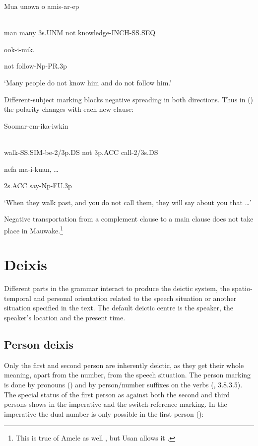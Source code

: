 \ea%
\label{ex:x1139}
\gll Mua  unowa  o    amis-ar-ep \\
      \\
\glt
\z

man  many  3s.UNM  not  knowledge-INCH-SS.SEQ

  ook-i-mik.

not  follow-Np-PR.3p

`Many people do not know him and do not follow him.'

Different-subject marking blocks negative spreading in both directions. Thus in () the polarity changes with each new clause:

\ea%
\label{ex:x1141}
\gll Soomar-em-ika-iwkin   \\
      \\
\glt
\z

walk-SS.SIM-be-2/3p.DS  not  3p.ACC  call-2/3s.DS

nefa  ma-i-kuan,  {\dots}

2s.ACC  say-Np-FU.3p

`When they walk past, and you do not call them, they will say about you that {\dots}'

Negative transportation from a complement clause to a main clause does not take place in Mauwake.\footnote{This is true of Amele as well \citep[44]{Roberts1987}, but Usan allows it \citep[278-280]{Reesink1987}.} 

\section{Deixis} 
\hypertarget{RefHeading22481935131865}{}
Different parts in the grammar interact to produce the deictic system, the spatio-temporal and personal orientation related to the speech situation or another situation specified in the text. The default deictic centre is the speaker, the speaker's location and the present time.  

\subsection{Person deixis}
\hypertarget{RefHeading22501935131865}{}
Only the first and second person are inherently deictic, as they get their whole meaning, apart from the number, from the speech situation. The person marking is done by pronouns () and by person/number suffixes on the verbs (, 3.8.3.5). The special status of the first person as against both the second and third persons shows in the imperative and the switch-reference marking. In the imperative the dual number is only possible in the first person (): 

